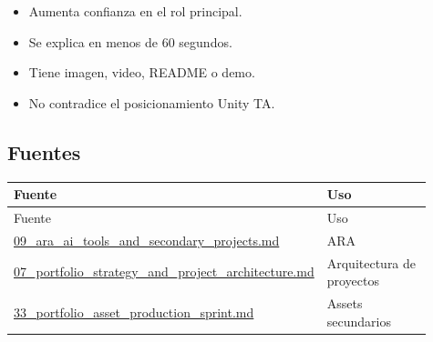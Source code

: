 \begin{itemize}
\item Aumenta confianza en el rol principal.
\item Se explica en menos de 60 segundos.
\item Tiene imagen, video, README o demo.
\item No contradice el posicionamiento Unity TA.
\end{itemize}


\subsection{Fuentes}


\begin{center}
\scriptsize
\begin{longtable}{>{\raggedright\arraybackslash}p{0.455\linewidth} >{\raggedright\arraybackslash}p{0.455\linewidth}}
\toprule
Fuente & Uso \\
\midrule
\endfirsthead
\toprule
Fuente & Uso \\
\midrule
\endhead
\href{file:///E:/Laboral/09_ara_ai_tools_and_secondary_projects.md}{09\_ara\_ai\_tools\_and\_secondary\_projects.md} & ARA \\
\href{file:///E:/Laboral/07_portfolio_strategy_and_project_architecture.md}{07\_portfolio\_strategy\_and\_project\_architecture.md} & Arquitectura de proyectos \\
\href{file:///E:/Laboral/33_portfolio_asset_production_sprint.md}{33\_portfolio\_asset\_production\_sprint.md} & Assets secundarios \\
\bottomrule
\end{longtable}
\end{center}
